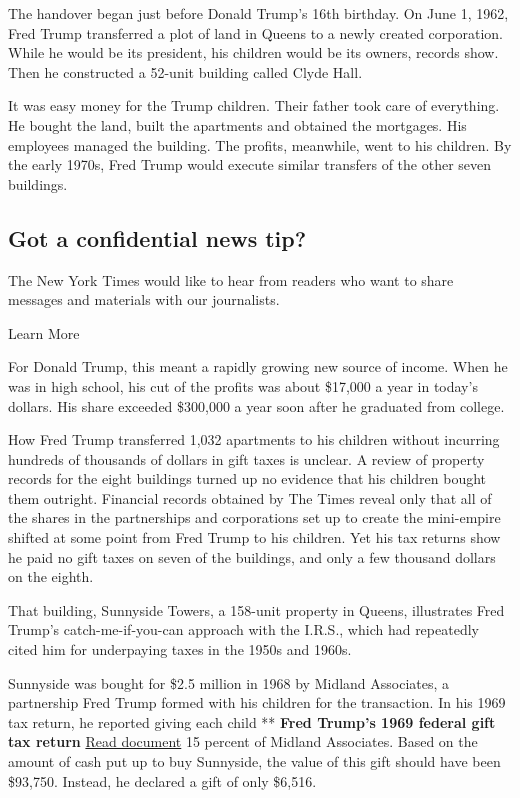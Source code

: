 The handover began just before Donald Trump's 16th birthday. On June 1,
1962, Fred Trump transferred a plot of land in Queens to a newly created
corporation. While he would be its president, his children would be its
owners, records show. Then he constructed a 52-unit building called
Clyde Hall.

It was easy money for the Trump children. Their father took care of
everything. He bought the land, built the apartments and obtained the
mortgages. His employees managed the building. The profits, meanwhile,
went to his children. By the early 1970s, Fred Trump would execute
similar transfers of the other seven buildings.

\hypertarget{got-a-confidential-news-tip}{%
\subsection{Got a confidential news
tip?}\label{got-a-confidential-news-tip}}

The New York Times would like to hear from readers who want to share
messages and materials with our journalists.

Learn More

For Donald Trump, this meant a rapidly growing new source of income.
When he was in high school, his cut of the profits was about \$17,000 a
year in today's dollars. His share exceeded \$300,000 a year soon after
he graduated from college.

How Fred Trump transferred 1,032 apartments to his children without
incurring hundreds of thousands of dollars in gift taxes is unclear. A
review of property records for the eight buildings turned up no evidence
that his children bought them outright. Financial records obtained by
The Times reveal only that all of the shares in the partnerships and
corporations set up to create the mini-empire shifted at some point from
Fred Trump to his children. Yet his tax returns show he paid no gift
taxes on seven of the buildings, and only a few thousand dollars on the
eighth.

That building, Sunnyside Towers, a 158-unit property in Queens,
illustrates Fred Trump's catch-me-if-you-can approach with the I.R.S.,
which had repeatedly cited him for underpaying taxes in the 1950s and
1960s.

Sunnyside was bought for \$2.5 million in 1968 by Midland Associates, a
partnership Fred Trump formed with his children for the transaction. In
his 1969 tax return, he reported giving each child ** \textbf{Fred
Trump's 1969 federal gift tax return}
\href{https://int.nyt.com/data/documenthelper/210-fct-1969-federal-gift-tax/37760d2a7b28b983e8ce/optimized/full.pdf\#page=1}{Read
document} 15 percent of Midland Associates. Based on the amount of cash
put up to buy Sunnyside, the value of this gift should have been
\$93,750. Instead, he declared a gift of only \$6,516.

